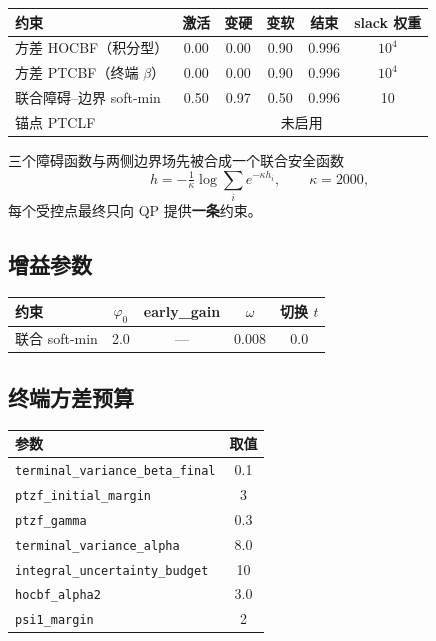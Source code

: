\documentclass[11pt,a4paper]{ctexart}
\newcommand{\cf}[1]{\texttt{\small #1}}
\begin{document}
\begin{center}
\small
\begin{tabular}{@{}lccccc@{}}
\toprule
\textbf{约束} & \textbf{激活} & \textbf{变硬} & \textbf{变软} & \textbf{结束} & \textbf{slack 权重} \\
\midrule
方差 HOCBF（积分型） & 0.00 & 0.00 & 0.90 & 0.996 & $10^{4}$ \\
方差 PTCBF（终端 $\beta$） & 0.00 & 0.00 & 0.90 & 0.996 & $10^{4}$ \\
联合障碍--边界 soft-min & 0.50 & 0.97 & 0.50 & 0.996 & 10 \\
锚点 PTCLF & \multicolumn{5}{c}{未启用} \\
\bottomrule
\end{tabular}
\end{center}
\noindent 三个障碍函数与两侧边界场先被合成一个联合安全函数
\[
h=-\tfrac{1}{\kappa}\log\sum_i e^{-\kappa h_i},\qquad \kappa=2000,
\]
每个受控点最终只向 QP 提供\textbf{一条}约束。

\subsection{增益参数}
\begin{center}
\small
\begin{tabular}{@{}lcccc@{}}
\toprule
\textbf{约束} & $\varphi_0$ & \textbf{early\_gain} & $\omega$ & \textbf{切换 }$t$ \\
\midrule
联合 soft-min & 2.0 & --- & 0.008 & 0.0 \\
\bottomrule
\end{tabular}
\end{center}

\subsection{终端方差预算}
\begin{center}
\small
\begin{tabular}{@{}lc@{}}
\toprule
\textbf{参数} & \textbf{取值} \\
\midrule
\cf{terminal\_variance\_beta\_final} & 0.1 \\
\cf{ptzf\_initial\_margin} & 3 \\
\cf{ptzf\_gamma} & 0.3 \\
\cf{terminal\_variance\_alpha} & 8.0 \\
\cf{integral\_uncertainty\_budget} & 10 \\
\cf{hocbf\_alpha2} & 3.0 \\
\cf{psi1\_margin} & 2 \\
\bottomrule
\end{tabular}
\end{center}
\end{document}
